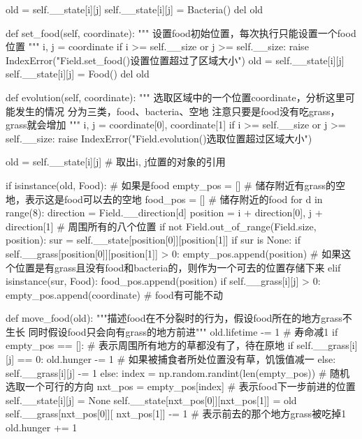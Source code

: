 \documentclass[a4paper]{ctexart}
\begin{document}
\begin{python}
			old = self.__state[i][j]
			self.__state[i][j] = Bacteria()
			del old
	
		def set_food(self, coordinate):
			"""
			设置food初始位置，每次执行只能设置一个food位置
			"""
			i, j = coordinate
			if i >= self.__size or j >= self.__size:
				raise IndexError("Field.set_food()设置位置超过了区域大小")
			old = self.__state[i][j]
			self.__state[i][j] = Food()
			del old
	
		def evolution(self, coordinate):
			"""
			选取区域中的一个位置coordinate，分析这里可能发生的情况
			分为三类，food、bacteria、空地
			注意只要是food没有吃grass，grass就会增加
			"""
			i, j = coordinate[0], coordinate[1]
			if i >= self.__size or j >= self.__size:
				raise IndexError("Field.evolution()选取位置超过区域大小")
	
			old = self.__state[i][j]  # 取出i, j位置的对象的引用
	
			if isinstance(old, Food):  # 如果是food
				empty_pos = []  # 储存附近有grass的空地，表示这是food可以去的空地
				food_pos = []  # 储存附近的food
				for d in range(8):
					direction = Field.__direction[d]
					position = i + direction[0], j + direction[1] # 周围所有的八个位置
					if not Field.out_of_range(Field.size, position): 
						sur = self.__state[position[0]][position[1]]
						if sur is None:
							if self.__grass[position[0]][position[1]] > 0:
								empty_pos.append(position) # 如果这个位置是有grass且没有food和bacteria的，则作为一个可去的位置存储下来
						elif isinstance(sur, Food):
							food_pos.append(position)
				if self.__grass[i][j] > 0:
					empty_pos.append(coordinate)  # food有可能不动
	
				def move_food(old):
					"""描述food在不分裂时的行为，假设food所在的地方grass不生长
					同时假设food只会向有grass的地方前进"""
					old.lifetime -= 1  # 寿命减1
					if empty_pos == []:  # 表示周围所有地方的草都没有了，待在原地
						if self.__grass[i][j] == 0:
							old.hunger -= 1  # 如果被捕食者所处位置没有草，饥饿值减一
						else:
							self.__grass[i][j] -= 1
					else:
						index = np.random.randint(len(empty_pos))  # 随机选取一个可行的方向
						nxt_pos = empty_pos[index]  # 表示food下一步前进的位置
						self.__state[i][j] = None
						self.__state[nxt_pos[0]][nxt_pos[1]] = old
						self.__grass[nxt_pos[0]][
							nxt_pos[1]] -= 1  # 表示前去的那个地方grass被吃掉1
						old.hunger += 1
	

\end{python}
\end{document}
